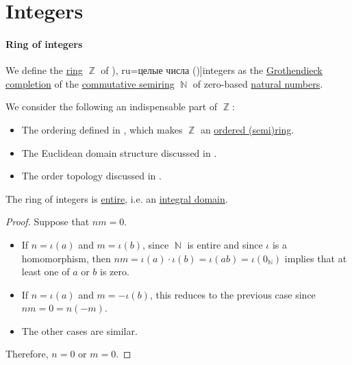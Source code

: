 \section{Integers}\label{sec:integers}

\paragraph{Ring of integers}

\begin{definition}\label{def:integers}\mimprovised
  We define the \hyperref[def:ring]{ring} \( \BbbZ \) of \term[bg=цели числа (\cite[374]{ГеновМиховскиМоллов1991Алгебра}), ru=целые числа (\cite[def. 20.1]{АлександровМаркушевичХинчин1951ЭнциклопедияТом1})]{integers} as the \hyperref[thm:grothendieck_semiring_completion]{Grothendieck completion} of the \hyperref[def:semiring/commutative]{commutative semiring} \( \BbbN \) of zero-based \hyperref[def:natural_numbers]{natural numbers}.
\end{definition}
\begin{comments}
  \item We consider the following an indispensable part of \( \BbbZ \):
  \begin{itemize}
    \item The ordering defined in , which makes \( \BbbZ \) an \hyperref[def:ordered_semiring]{ordered (semi)ring}.
    \item The Euclidean domain structure discussed in .
    \item The order topology discussed in .
  \end{itemize}
\end{comments}

\begin{proposition}\label{thm:integers_are_integral_domain}
  The ring of integers is \hyperref[def:entire_semiring]{entire}, i.e. an \hyperref[def:integral_domain]{integral domain}.
\end{proposition}
\begin{proof}
  Suppose that \( nm = 0 \).

  \begin{itemize}
    \item If \( n = \iota(a) \) and \( m = \iota(b) \), since \( \BbbN \) is entire and since \( \iota \) is a homomorphism, then \( nm = \iota(a) \cdot \iota(b) = \iota(ab) = \iota(0_\BbbN) \) implies that at least one of \( a \) or \( b \) is zero.
    \item If \( n = \iota(a) \) and \( m = -\iota(b) \), this reduces to the previous case since \( nm = 0 = n(-m) \).
    \item The other cases are similar.
  \end{itemize}

  Therefore, \( n = 0 \) or \( m = 0 \).
\end{proof}

